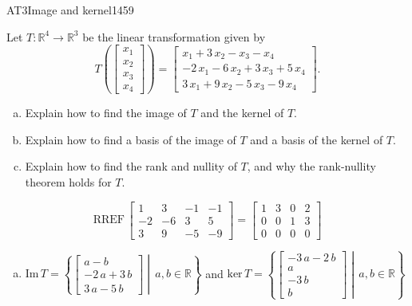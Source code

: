 \begin{exercise}{AT3}{Image and kernel}{1459} 
\begin{exerciseStatement} 

 Let \(T:\mathbb{R}^4 \to \mathbb{R}^3\) be the linear transformation given by \[T\left( \left[\begin{array}{c}
x_{1} \\
x_{2} \\
x_{3} \\
x_{4}
\end{array}\right] \right) = \left[\begin{array}{c}
x_{1} + 3 \, x_{2} - x_{3} - x_{4} \\
-2 \, x_{1} - 6 \, x_{2} + 3 \, x_{3} + 5 \, x_{4} \\
3 \, x_{1} + 9 \, x_{2} - 5 \, x_{3} - 9 \, x_{4}
\end{array}\right].\] 

 

\begin{enumerate}[(a)]
\item Explain how to find the image of \(T\) and the kernel of \(T\).
\item Explain how to find a basis of the image of \(T\) and a basis of the kernel of \(T\).
\item Explain how to find the rank and nullity of \(T\), and why the rank-nullity theorem holds for \(T\).
\end{enumerate}

     \end{exerciseStatement}
 \begin{exerciseAnswer} 

\[\mathrm{RREF}\,\left[\begin{array}{cccc}
1 & 3 & -1 & -1 \\
-2 & -6 & 3 & 5 \\
3 & 9 & -5 & -9
\end{array}\right]=\left[\begin{array}{cccc}
1 & 3 & 0 & 2 \\
0 & 0 & 1 & 3 \\
0 & 0 & 0 & 0
\end{array}\right]\]

 

\begin{enumerate}[(a)]
\item  

 \(\mathrm{Im}\,T =  \left\{ \left[\begin{array}{c}
a - b \\
-2 \, a + 3 \, b \\
3 \, a - 5 \, b
\end{array}\right] \middle|\,a,b\in\mathbb{R}\right\}\) and \(\mathrm{ker}\,T = \left\{ \left[\begin{array}{c}
-3 \, a - 2 \, b \\
a \\
-3 \, b \\
b
\end{array}\right] \middle|\,a,b\in\mathbb{R}\right\}\) 


\end{enumerate}
\end{exerciseAnswer}
\end{exercise}

